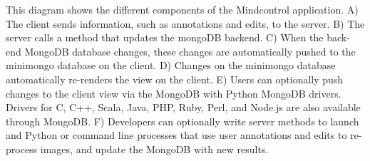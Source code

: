 \label{fig:appstructure}

This diagram shows the different components of the Mindcontrol application. A) The client sends information, such as annotations and edits, to the server. B) The server calls a method that updates the mongoDB backend. C) When the back-end MongoDB database changes, these changes are automatically pushed to the minimongo database on the client. D) Changes on the minimongo database automatically re-renders the view on the client. E) Users can optionally push changes to the client view via the MongoDB with Python MongoDB drivers. Drivers for C, C++, Scala, Java, PHP, Ruby, Perl, and Node.js are also available through MongoDB. F) Developers can optionally write server methods to launch and Python or command line processes that use user annotations and edits to re-process images, and update the MongoDB with new results.